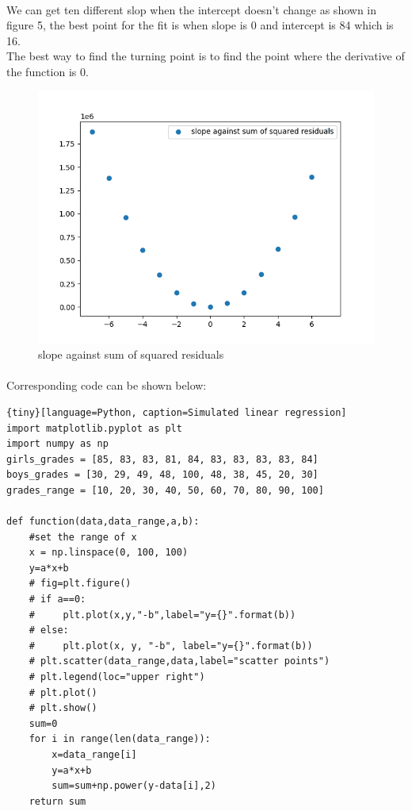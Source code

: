 \documentclass[a4paper,12pt]{article}
\begin{document}
\begin{spacing}{2}
\paragraph{ } We can get ten different slop when the intercept doesn't change as shown in figure 5, the best point for the fit is when slope is 0 and intercept is 84 which is 16.\\
The best way to find the turning point is to find the point where the derivative of the function is 0.
\begin{figure}[h]
\centering
\includegraphics[scale=0.5]{Figure_5.png}
\caption{slope against sum of squared residuals}
\label{slope against sum of squared residuals}
\end{figure}
\paragraph{ } Corresponding code can be shown below:
\begin{tiny}
\begin{lstlisting}{tiny}[language=Python, caption=Simulated linear regression]
import matplotlib.pyplot as plt
import numpy as np
girls_grades = [85, 83, 83, 81, 84, 83, 83, 83, 83, 84]
boys_grades = [30, 29, 49, 48, 100, 48, 38, 45, 20, 30]
grades_range = [10, 20, 30, 40, 50, 60, 70, 80, 90, 100]

def function(data,data_range,a,b):
    #set the range of x
    x = np.linspace(0, 100, 100)
    y=a*x+b
    # fig=plt.figure()
    # if a==0:
    #     plt.plot(x,y,"-b",label="y={}".format(b))
    # else:
    #     plt.plot(x, y, "-b", label="y={}".format(b))
    # plt.scatter(data_range,data,label="scatter points")
    # plt.legend(loc="upper right")
    # plt.plot()
    # plt.show()
    sum=0
    for i in range(len(data_range)):
        x=data_range[i]
        y=a*x+b
        sum=sum+np.power(y-data[i],2)
    return sum



\end{lstlisting}
\end{tiny}
\end{spacing}
\end{document}
